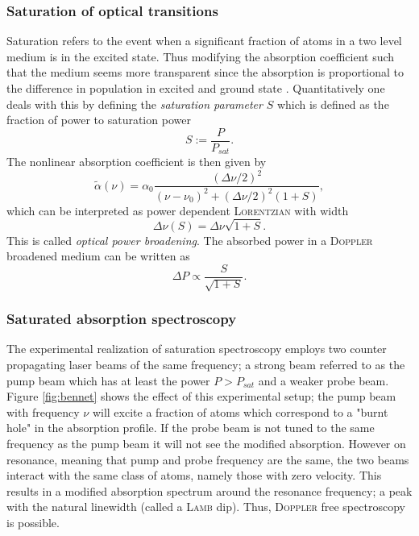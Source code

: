 \documentclass[11pt,a4paper,notitlepage]{scrartcl}
\begin{document}
\subsubsection{Saturation of optical transitions}
Saturation refers to the event when a significant fraction of atoms in a two level medium is in the excited state. Thus modifying the absorption coefficient such that the medium seems more transparent since the absorption is proportional to the difference in population in excited and ground state \cite{manual}. Quantitatively one deals with this by defining the \emph{saturation parameter} $S$ which is defined as the fraction of power to saturation power \begin{equation}\label{eq:spar}
	S:=\frac{P}{P_{sat}}.
\end{equation}
The nonlinear absorption coefficient is then given by \begin{equation}\label{eq:nonlinear}
	\tilde{\alpha}(\nu)=\alpha_0\frac{(\Delta\nu/2)^2}{(\nu-\nu_0)^2+(\Delta\nu/2)^2(1+S)},
\end{equation}
which can be interpreted as power dependent \textsc{Lorentzian} with width \begin{equation}\label{eq:powernu}\Delta\nu(S)=\Delta\nu\sqrt{1+S}.\end{equation}
This is called \emph{optical power broadening}. \cite{manual}
The absorbed power in a \textsc{Doppler} broadened medium can be written as \cite{manual} \begin{equation}
		\Delta P\propto\frac{S}{\sqrt{1+S}}.
		\label{eq:power}
	\end{equation}
\subsubsection{Saturated absorption spectroscopy}
The experimental realization of saturation spectroscopy employs two counter propagating laser beams of the same frequency; a strong beam referred to as the pump beam which has at least the power $P>P_{sat}$ and a weaker probe beam. Figure \ref{fig:bennet} shows the effect of this experimental setup; the pump beam with frequency $\nu$ will excite a fraction of atoms which correspond to a "burnt hole" in the absorption profile. If the probe beam is not tuned to the same frequency as the pump beam it will not see the modified absorption. However on resonance, meaning that pump and probe frequency are the same, the two beams interact with the same class of atoms, namely those with zero velocity. This results in a modified absorption spectrum around the resonance frequency; a peak with the natural linewidth (called a \textsc{Lamb} dip). Thus, \textsc{Doppler} free spectroscopy is possible. \cite{manual}
\end{document}
